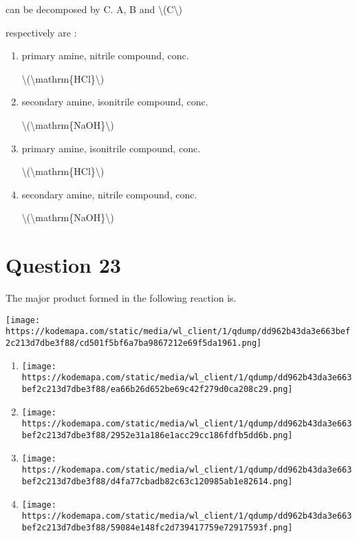 \documentclass{article}
\begin{document}
can be decomposed by C. A, B and \textbackslash(C\textbackslash)

respectively are :


\begin{enumerate}[label=(\alph*)]
\item primary amine, nitrile compound, conc.

\textbackslash(\textbackslash mathrm\{HCl\}\textbackslash)


\item secondary amine, isonitrile compound, conc.

\textbackslash(\textbackslash mathrm\{NaOH\}\textbackslash)


\item primary amine, isonitrile compound, conc.

\textbackslash(\textbackslash mathrm\{HCl\}\textbackslash)


\item secondary amine, nitrile compound, conc.

\textbackslash(\textbackslash mathrm\{NaOH\}\textbackslash)


\end{enumerate}
\newpage
\section*{Question 23}
The major product formed in the following reaction is.



\texttt{[image: https://kodemapa.com/static/media/wl\_client/1/qdump/dd962b43da3e663bef2c213d7dbe3f88/cd501f5bf6a7ba9867212e69f5da1961.png]}\\


\begin{enumerate}[label=(\alph*)]
\item \texttt{[image: https://kodemapa.com/static/media/wl\_client/1/qdump/dd962b43da3e663bef2c213d7dbe3f88/ea66b26d652be69c42f279d0ca208c29.png]}


\item \texttt{[image: https://kodemapa.com/static/media/wl\_client/1/qdump/dd962b43da3e663bef2c213d7dbe3f88/2952e31a186e1acc29cc186fdfb5dd6b.png]}


\item \texttt{[image: https://kodemapa.com/static/media/wl\_client/1/qdump/dd962b43da3e663bef2c213d7dbe3f88/d4fa77cbadb82c63c120985ab1e82614.png]}


\item \texttt{[image: https://kodemapa.com/static/media/wl\_client/1/qdump/dd962b43da3e663bef2c213d7dbe3f88/59084e148fc2d739417759e72917593f.png]}


\end{enumerate}
\newpage
\end{document}
